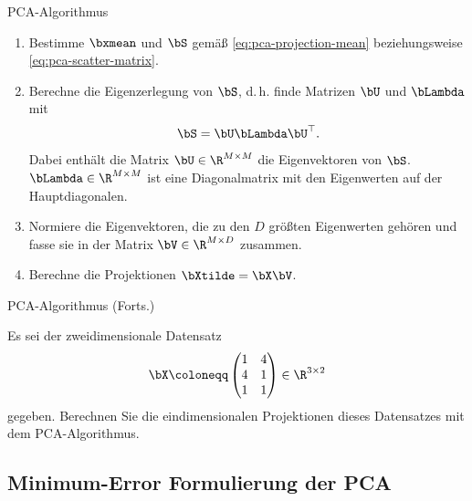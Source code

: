 \begin{frame}{PCA-Algorithmus}{}
	\begin{myalg}
		\begin{enumerate}
			\item Bestimme $\bxmean$ und $\bS$ gemäß \eqref{eq:pca-projection-mean} beziehungsweise
				\eqref{eq:pca-scatter-matrix}.
			\item Berechne die Eigenzerlegung von $\bS$, d.\,h. finde Matrizen $\bU$ und $\bLambda$ mit
				$$\bS = \bU \bLambda \bU^\top.$$ Dabei enthält die Matrix $\bU \in \R^{M \times M}$ die
				Eigenvektoren von $\bS$. $\bLambda \in \R^{M \times M}$ ist eine Diagonalmatrix
				mit den Eigenwerten auf der Hauptdiagonalen.
			\item Normiere die Eigenvektoren, die zu den $D$ größten Eigenwerten gehören und fasse sie in der Matrix
				$\bV \in \R^{M \times D}$ zusammen.
			\item Berechne die Projektionen $\bXtilde = \bX \bV$.
		\end{enumerate}
	\end{myalg}
\end{frame}


\begin{frame}{PCA-Algorithmus (Forts.)}{}
	\begin{mytask}
		Es sei der zweidimensionale Datensatz
		\begin{equation*}
			\bX \coloneqq \begin{pmatrix} 1 & 4 \\ 4 & 1 \\ 1 & 1 \end{pmatrix} \in \R^{3 \times 2}
		\end{equation*} gegeben. Berechnen Sie die eindimensionalen Projektionen dieses Datensatzes
		mit dem PCA-Algorithmus.
	\end{mytask}
\end{frame}


\subsection{Minimum-Error Formulierung der PCA}

